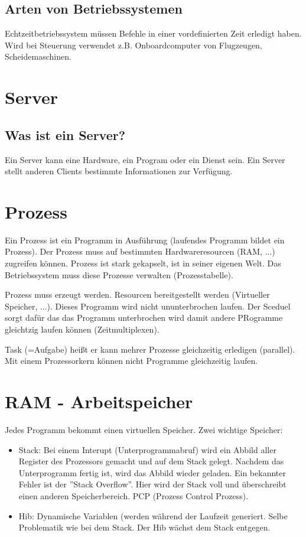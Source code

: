 \documentclass[a4paper,final]{report}
\begin{document}
{\section{Arten von Betriebssystemen}

Echtzeitbetriebssystem müssen Befehle in einer vordefinierten Zeit erledigt haben. Wird bei Steuerung verwendet z.B. Onboardcomputer von Flugzeugen, Scheidemaschinen.

\chapter{Server}

\section{Was ist ein Server?}

Ein Server kann eine Hardware, ein Program oder ein Dienst sein.
Ein Server stellt anderen Clients bestimmte Informationen zur Verfügung.

\chapter{Prozess}

Ein Prozess ist ein Programm in Ausführung (laufendes Programm bildet ein Prozess). Der Prozess muss auf bestimmten Hardwareresourcen (RAM, ...) zugreifen können. Prozess ist stark gekapselt, ist in seiner eigenen Welt. Das Betriebssystem muss diese Prozesse verwalten (Prozesstabelle).

Prozess muss erzeugt werden. Resourcen bereitgestellt werden (Virtueller Speicher, ...). Dieses Programm wird nicht ununterbrochen laufen. Der Sceduel sorgt dafür das das Programm unterbrochen wird damit andere PRogramme gleichtzig laufen können (Zeitmultiplexen).

Task (=Aufgabe) heißt er kann mehrer Prozesse gleichzeitig erledigen (parallel). Mit einem Prozessorkern können nicht Programme gleichzeitig laufen.


\chapter{RAM - Arbeitspeicher}

Jedes Programm bekommt einen virtuellen Speicher. Zwei wichtige Speicher:

\begin{itemize}
\item Stack: Bei einem Interupt (Unterprogrammabruf) wird ein Abbild aller Register des Prozessors gemacht und auf dem Stack gelegt. Nachdem das Unterprogramm fertig ist, wird das Abbild wieder geladen. Ein bekannter Fehler ist der ''Stack Overflow''. Hier wird der Stack voll und überschreibt einen anderen Speicherbereich. PCP (Prozess Control Prozess).
\item Hib: Dynamische Variablen (werden während der Laufzeit generiert. Selbe Problematik wie bei dem Stack. Der Hib wächst dem Stack entgegen.
\end{itemize}

}
\end{document}
